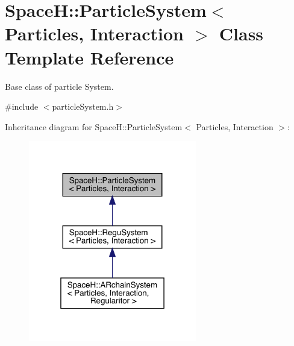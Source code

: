 \hypertarget{class_space_h_1_1_particle_system}{}\section{SpaceH\+:\+:Particle\+System$<$ Particles, Interaction $>$ Class Template Reference}
\label{class_space_h_1_1_particle_system}


Base class of particle System.  




{\ttfamily \#include $<$particle\+System.\+h$>$}



Inheritance diagram for SpaceH\+:\+:Particle\+System$<$ Particles, Interaction $>$\+:
\nopagebreak
\begin{figure}[H]
\begin{center}
\leavevmode
\includegraphics[width=208pt]{class_space_h_1_1_particle_system__inherit__graph}
\end{center}
\end{figure}


